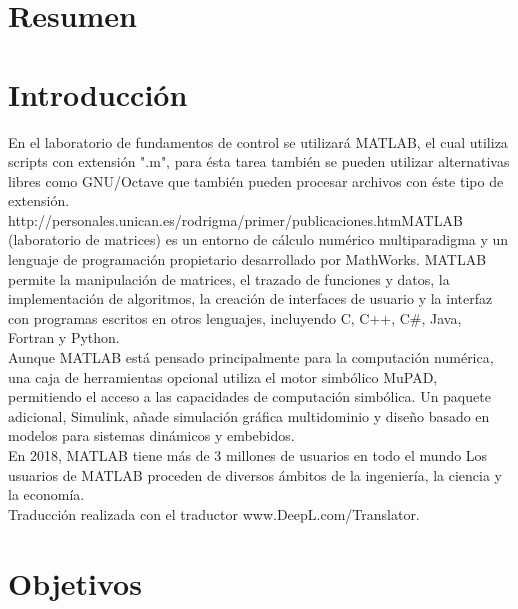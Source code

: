 \documentclass[]{article}
\begin{document}

\tableofcontents  %


\section{Resumen}

\section{Introducción}

En el laboratorio de fundamentos de control se utilizará MATLAB, el cual utiliza scripts con extensión ".m", para ésta tarea también se pueden utilizar alternativas libres como GNU/Octave que también pueden procesar archivos con éste tipo de extensión.\\

http://personales.unican.es/rodrigma/primer/publicaciones.htmMATLAB (laboratorio de matrices) es un entorno de cálculo numérico multiparadigma y un lenguaje de programación propietario desarrollado por MathWorks. MATLAB permite la manipulación de matrices, el trazado de funciones y datos, la implementación de algoritmos, la creación de interfaces de usuario y la interfaz con programas escritos en otros lenguajes, incluyendo C, C++, C#, Java, Fortran y Python.\cite{MATLABWiki}\\

Aunque MATLAB está pensado principalmente para la computación numérica, una caja de herramientas opcional utiliza el motor simbólico MuPAD, permitiendo el acceso a las capacidades de computación simbólica. Un paquete adicional, Simulink, añade simulación gráfica multidominio y diseño basado en modelos para sistemas dinámicos y embebidos.\cite{MATLABWiki}\\

En 2018, MATLAB tiene más de 3 millones de usuarios en todo el mundo Los usuarios de MATLAB proceden de diversos ámbitos de la ingeniería, la ciencia y la economía.\cite{MATLABWiki}\\ 

Traducción realizada con el traductor www.DeepL.com/Translator.\cite{Deepl}

\section{Objetivos}
\end{document}
